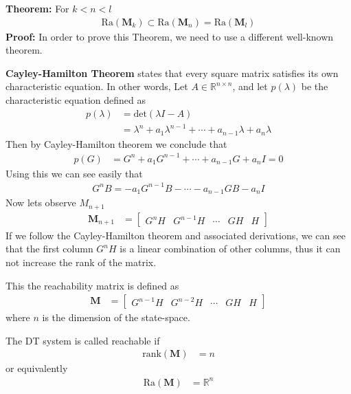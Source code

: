 \documentclass[twoside]{article}
\begin{document}
\textbf{Theorem:} For $k < n < l$
%
\begin{align*}
  \mathrm{Ra} ( \mathbf{M}_k ) \subset \mathrm{Ra} ( \mathbf{M}_{n} )
= \mathrm{Ra} ( \mathbf{M}_{l} )
\end{align*}
%
\textbf{Proof:} In order to prove this Theorem, we need to use a
different well-known theorem. 

\textbf{Cayley-Hamilton Theorem} states that every square matrix
satisfies its own characteristic equation. In other words, Let 
$A \in \mathbb{R}^{n \times n}$, and let $p(\lambda)$ be the
characteristic equation defined as
%
\begin{align*}
 p(\lambda) &= \mathrm{det} \left( \lambda I - A \right) 
\\
&= \lambda^n + a_1 \lambda^{n-1} + \cdots + a_{n-1} \lambda + a_n \lambda
\end{align*}
%
Then by Cayley-Hamilton theorem we conclude that
%
\begin{align*}
 p(G) &= G^n + a_1 G^{n-1} + \cdots + a_{n-1} G + a_n I = 0
\end{align*}
%
Using this we can see easily that 
%
\begin{align*}
 G^n B = -a_1 G^{n-1} B - \cdots - a_{n-1} G B - a_n I
\end{align*}
%
Now lets observe $M_{n+1}$
%
\begin{align*}
\mathbf{M}_{n+1} &= 
         \left[ \begin{array}{c|c|c|c|c} G^{n} H & G^{n-1} H &
         \cdots & G H & H \end{array} \right]
\end{align*}
% 
If we follow the Cayley-Hamilton theorem and associated derivations,
we can see that the first column $G^{n} H$ is a linear combination of
other columns, thus it can not increase the rank of the matrix. 

This the reachability matrix is defined as
%
\begin{align*}
 \mathbf{M} &= 
         \left[ \begin{array}{c|c|c|c|c} G^{n-1} H & G^{n-2} H &
         \cdots & G H & H \end{array} \right]
\end{align*}
%
where $n$ is the dimension of the state-space.

The DT system is called reachable if 
\begin{align*}
 \mathrm{rank} (\mathbf{M}) &= n 
\end{align*}
or equivalently
\begin{align*}
 \mathrm{Ra} (\mathbf{M}) &= \mathbb{R}^n
\end{align*}
\end{document}

